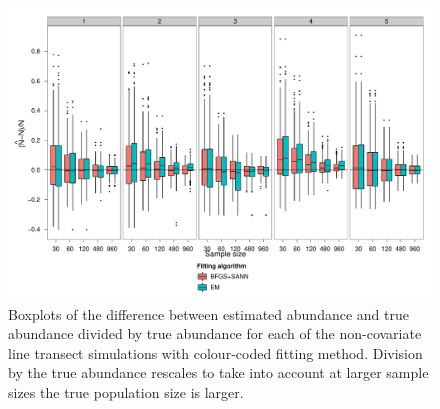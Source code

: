 \begin{figure}
\centering
\includegraphics[width=6in]{mix/figs/nocov-N.pdf}
\caption{Boxplots of the difference between estimated abundance and true abundance divided by true abundance for each of the non-covariate line transect simulations with colour-coded fitting method. Division by the true abundance rescales to take into account at larger sample sizes the true population size is larger.}
\label{mmds-nocov-N-boxplots}
\end{figure}

